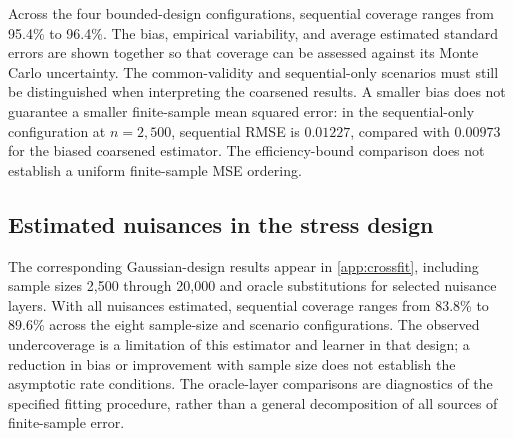 Across the four bounded-design configurations, sequential coverage ranges from 95.4\% to 96.4\%. The bias, empirical variability, and average estimated standard errors are shown together so that coverage can be assessed against its Monte Carlo uncertainty. The common-validity and sequential-only scenarios must still be distinguished when interpreting the coarsened results. A smaller bias does not guarantee a smaller finite-sample mean squared error: in the sequential-only configuration at $n=2{,}500$, sequential RMSE is $0.01227$, compared with $0.00973$ for the biased coarsened estimator. The efficiency-bound comparison does not establish a uniform finite-sample MSE ordering.

\subsection{Estimated nuisances in the stress design}\label{sec:estimated-nuisance}

The corresponding Gaussian-design results appear in \cref{app:crossfit}, including sample sizes 2,500 through 20,000 and oracle substitutions for selected nuisance layers. With all nuisances estimated, sequential coverage ranges from 83.8\% to 89.6\% across the eight sample-size and scenario configurations. The observed undercoverage is a limitation of this estimator and learner in that design; a reduction in bias or improvement with sample size does not establish the asymptotic rate conditions. The oracle-layer comparisons are diagnostics of the specified fitting procedure, rather than a general decomposition of all sources of finite-sample error.

\FloatBarrier
